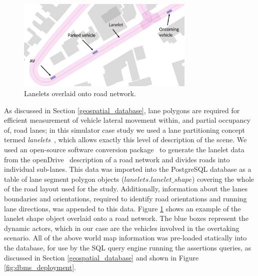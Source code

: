 \begin{figure}[htp]
    \centering
    \includegraphics[width=8.5cm]{../other/figures/Lanelets_anno_av.png}
    \caption{Lanelets overlaid onto road network.}
    \label{fig:lanelets}
\end{figure} 

As discussed in Section \ref{geospatial_database}, lane polygons are required for efficient measurement of vehicle lateral movement within, and partial occupancy of, road lanes; in this simulator case study we used a lane partitioning concept termed \textit{lanelets}~\cite{lanelets2014}, which allows exactly this level of description of the scene. We used an open-source software conversion package~\cite{lanelets_to_openDrive} to generate the lanelet data from the openDrive~\cite{opendrive} description of a road network and divides roads into individual sub-lanes. This data was imported into the PostgreSQL database as a table of lane segment polygon objects ($lanelets.lanelet\_shape$) covering the whole of the road layout used for the study. Additionally, information about the lanes boundaries and orientations, required to identify road orientations and running lane directions, was appended to this data. 
%
Figure \ref{fig:lanelets} shows an example of the lanelet shape object overlaid onto a road network. The blue boxes represent the dynamic actors, which in our case are the vehicles involved in the overtaking scenario. 
%
All of the above world map information was pre-loaded statically into the database, for use by the SQL query engine running the assertions queries, as discussed in Section \ref{geospatial_database} and shown in Figure \ref{fig:dbms_deployment}.

